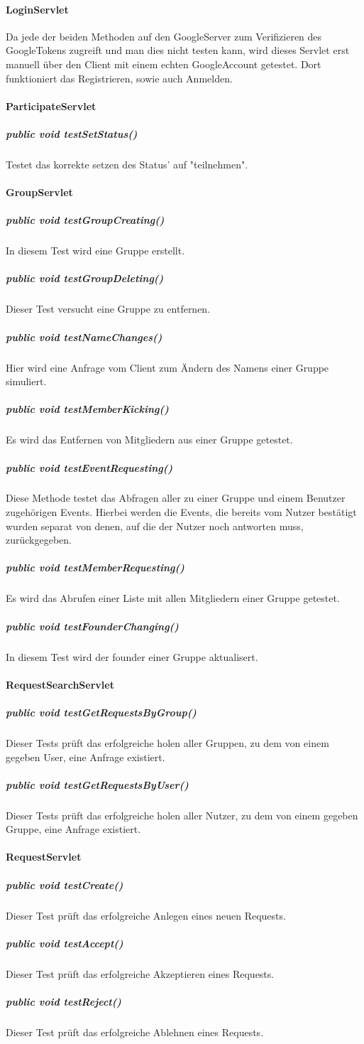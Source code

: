 \documentclass{scrartcl}
\begin{document}
	\paragraph{LoginServlet}
	Da jede der beiden Methoden auf den GoogleServer zum Verifizieren des GoogleTokens zugreift und man dies nicht testen kann, wird dieses Servlet erst manuell über den Client mit einem echten GoogleAccount getestet. Dort funktioniert das Registrieren, sowie auch Anmelden.
	\paragraph{ParticipateServlet}
	\subparagraph{public void testSetStatus()}
	Testet das korrekte setzen des Status' auf "teilnehmen".
	\paragraph{GroupServlet}
	\subparagraph{public void testGroupCreating()}
	In diesem Test wird eine Gruppe erstellt.
	\subparagraph{public void testGroupDeleting()}
	Dieser Test versucht eine Gruppe zu entfernen.
	\subparagraph{public void testNameChanges()}
	Hier wird eine Anfrage vom Client zum Ändern des Namens einer Gruppe simuliert.
	\subparagraph{public void testMemberKicking()}
	Es wird das Entfernen von Mitgliedern aus einer Gruppe getestet.
	\subparagraph{public void testEventRequesting()}
	Diese Methode testet das Abfragen aller zu einer Gruppe und einem Benutzer zugehörigen Events. Hierbei werden die Events, die bereits vom Nutzer bestätigt wurden separat von denen, auf die der Nutzer noch antworten muss, zurückgegeben.
	\subparagraph{public void testMemberRequesting()}
	Es wird das Abrufen einer Liste mit allen Mitgliedern einer Gruppe getestet.
	\subparagraph{public void testFounderChanging()}
	In diesem Test wird der founder einer Gruppe aktualisert.
	\paragraph{RequestSearchServlet}
	\subparagraph{public void testGetRequestsByGroup()}
	Dieser Tests prüft das erfolgreiche holen aller Gruppen, zu dem von einem gegeben User, eine Anfrage existiert.
	\subparagraph{public void testGetRequestsByUser()}
	Dieser Tests prüft das erfolgreiche holen aller Nutzer, zu dem von einem gegeben Gruppe, eine Anfrage existiert.
	\paragraph{RequestServlet}
	\subparagraph{public void testCreate()}
	Dieser Test prüft das erfolgreiche Anlegen eines neuen Requests.
	\subparagraph{public void testAccept()}
	Dieser Test prüft das erfolgreiche Akzeptieren eines Requests.
	\subparagraph{public void testReject()}
	Dieser Test prüft das erfolgreiche Ablehnen eines Requests.
\end{document}
